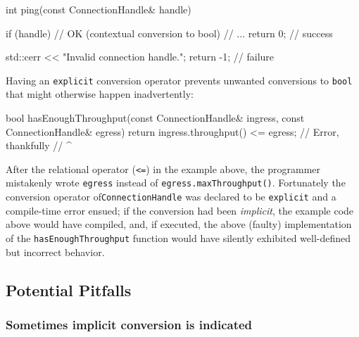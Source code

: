 \begin{emcppslisting}[emcppsbatch=e2]
int ping(const ConnectionHandle& handle)
{
    if (handle)  // OK (contextual conversion to bool)
    {
        // ...
        return 0;  // success
    }

    std::cerr << "Invalid connection handle.\n";
    return -1;  // failure
}
\end{emcppslisting}
    
\noindent Having an \lstinline!explicit! conversion operator prevents unwanted
conversions to \lstinline!bool! that might otherwise happen inadvertently:

\begin{emcppslisting}[emcppsbatch=e2]
bool hasEnoughThroughput(const ConnectionHandle& ingress,
                         const ConnectionHandle& egress)
{
    return ingress.throughput() <= egress;  // Error, thankfully
//                                    ^~~~~~
}
\end{emcppslisting}
    
\noindent After the relational operator (\lstinline!<=!) in the example above, the
programmer mistakenly wrote \lstinline!egress! instead of
\mbox{\lstinline!egress.maxThroughput()!}. Fortunately the conversion operator of\linebreak[4] %
\mbox{\lstinline!ConnectionHandle!} was declared to be \lstinline!explicit! and a
compile-time error ensued; if the conversion had
been \emph{implicit}, the example code above would have compiled, and,
if executed, the above (faulty) implementation of the \mbox{\lstinline!hasEnoughThroughput!}
function would have silently exhibited well-defined but incorrect
behavior.

\subsection[Potential Pitfalls]{Potential Pitfalls}\label{potential-pitfalls-explicitconv}

\subsubsection[Sometimes implicit conversion \emph{is} indicated]{Sometimes implicit conversion {\sfbsubsubsecitalRomeo is} indicated}\label{sometimes-implicit-conversion-is-indicated}

